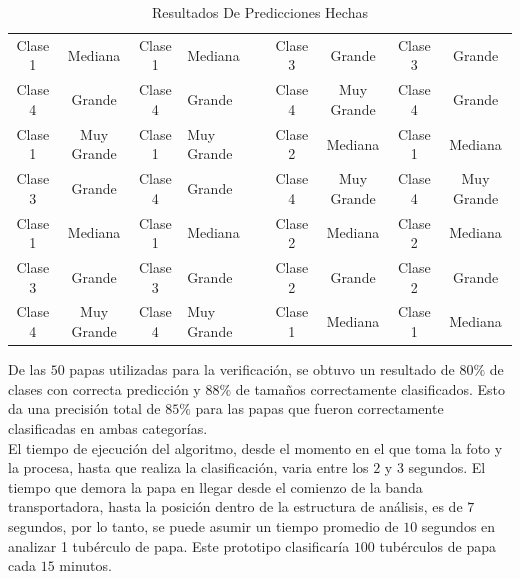 \begin{table}[ht]
{\begin{tabular}{|cc|cl|l|cc|cc|}
		\multicolumn{1}{|c|}{Clase 1} & Mediana    & \multicolumn{1}{c|}{Clase 1} & Mediana    &  & \multicolumn{1}{c|}{Clase 3} & Grande     & \multicolumn{1}{c|}{Clase 3} & Grande     \\ \cline{1-4} \cline{6-9} 
		\multicolumn{1}{|c|}{Clase 4} & Grande     & \multicolumn{1}{c|}{Clase 4} & Grande     &  & \multicolumn{1}{c|}{Clase 4} & Muy Grande & \multicolumn{1}{c|}{Clase 4} & Grande     \\ \cline{1-4} \cline{6-9} 
		\multicolumn{1}{|c|}{Clase 1} & Muy Grande & \multicolumn{1}{c|}{Clase 1} & Muy Grande &  & \multicolumn{1}{c|}{Clase 2} & Mediana    & \multicolumn{1}{c|}{Clase 1} & Mediana    \\ \cline{1-4} \cline{6-9} 
		\multicolumn{1}{|c|}{Clase 3} & Grande     & \multicolumn{1}{c|}{Clase 4} & Grande     &  & \multicolumn{1}{c|}{Clase 4} & Muy Grande & \multicolumn{1}{c|}{Clase 4} & Muy Grande \\ \cline{1-4} \cline{6-9} 
		\multicolumn{1}{|c|}{Clase 1} & Mediana    & \multicolumn{1}{c|}{Clase 1} & Mediana    &  & \multicolumn{1}{c|}{Clase 2} & Mediana    & \multicolumn{1}{c|}{Clase 2} & Mediana    \\ \cline{1-4} \cline{6-9} 
		\multicolumn{1}{|c|}{Clase 3} & Grande     & \multicolumn{1}{c|}{Clase 3} & Grande     &  & \multicolumn{1}{c|}{Clase 2} & Grande     & \multicolumn{1}{c|}{Clase 2} & Grande     \\ \cline{1-4} \cline{6-9} 
		\multicolumn{1}{|c|}{Clase 4} & Muy Grande & \multicolumn{1}{c|}{Clase 4} & Muy Grande &  & \multicolumn{1}{c|}{Clase 1} & Mediana    & \multicolumn{1}{c|}{Clase 1} & Mediana    \\ \cline{1-4} \cline{6-9} 
	\end{tabular}
	}
	\caption{Resultados De Predicciones Hechas}
	\label{table:res}
\end{table}




De las $50$ papas utilizadas para la verificación, se obtuvo un resultado de $80\%$ de clases con correcta predicción y $88\%$ de tamaños correctamente clasificados. Esto da una precisión total de $85\%$ para las papas que fueron correctamente clasificadas en ambas categorías.\\

El tiempo de ejecución del algoritmo, desde el momento en el que toma la foto y la procesa, hasta que realiza la clasificación, varia entre los $2$ y $3$ segundos. El tiempo que demora la papa en llegar desde el comienzo de la banda transportadora, hasta la posición dentro de la estructura de análisis, es de $7$ segundos, por lo tanto, se puede asumir un tiempo promedio de $10$ segundos en analizar 1 tubérculo de papa. Este prototipo clasificaría $100$ tubérculos de papa cada $15$ minutos.	 	

